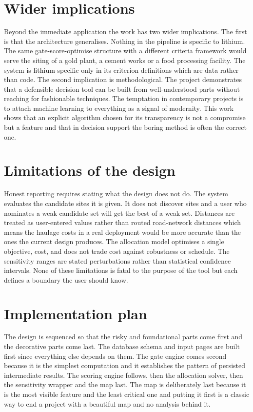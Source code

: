\documentclass[12pt,a4paper]{report}
\begin{document}
\section{Wider implications}
Beyond the immediate application the work has two wider implications.
The first is that the architecture generalises. Nothing in the
pipeline is specific to lithium. The same gate-score-optimise
structure with a different criteria framework would serve the siting
of a gold plant, a cement works or a food processing facility. The
system is lithium-specific only in its criterion definitions which
are data rather than code. The second implication is methodological.
The project demonstrates that a defensible decision tool can be built
from well-understood parts without reaching for fashionable
techniques. The temptation in contemporary projects is to attach
machine learning to everything as a signal of modernity. This work
shows that an explicit algorithm chosen for its transparency is not a
compromise but a feature and that in decision support the boring
method is often the correct one.

\section{Limitations of the design}
Honest reporting requires stating what the design does not do. The
system evaluates the candidate sites it is given. It does not discover
sites and a user who nominates a weak candidate set will get the best
of a weak set. Distances are treated as user-entered values rather
than routed road-network distances which means the haulage costs in a
real deployment would be more accurate than the ones the current
design produces. The allocation model optimises a single objective,
cost, and does not trade cost against robustness or schedule. The
sensitivity ranges are stated perturbations rather than statistical
confidence intervals. None of these limitations is fatal to the
purpose of the tool but each defines a boundary the user should know.

\section{Implementation plan}
The design is sequenced so that the risky and foundational parts come
first and the decorative parts come last. The database schema and
input pages are built first since everything else depends on them.
The gate engine comes second because it is the simplest computation
and it establishes the pattern of persisted intermediate results. The
scoring engine follows, then the allocation solver, then the
sensitivity wrapper and the map last. The map is deliberately last
because it is the most visible feature and the least critical one and
putting it first is a classic way to end a project with a beautiful
map and no analysis behind it.
\end{document}
